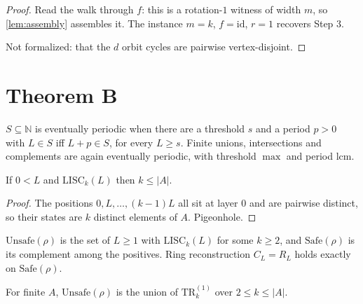 \begin{proof}
\leanok
{}
Read the walk through $f$: this is a rotation-$1$ witness of width $m$, so
\ref{lem:assembly} assembles it. The instance $m=k$, $f = \mathrm{id}$, $r=1$
recovers Step 3.

Not formalized: that the $d$ orbit cycles are pairwise vertex-disjoint.
\end{proof}

\section{Theorem B}

\begin{definition}
\label{def:evperiodic}
\leanok
$S \subseteq \mathbb{N}$ is eventually periodic when there are a threshold $s$
and a period $p > 0$ with $L \in S$ iff $L+p \in S$, for every $L \geq s$.
Finite unions, intersections and complements are again eventually periodic,
with threshold $\max$ and period $\mathrm{lcm}$.
\end{definition}

\begin{lemma}
\label{lem:kcap}
\leanok
{}
If $0 < L$ and $\mathrm{LISC}_k(L)$ then $k \leq |A|$.
\end{lemma}

\begin{proof}
\leanok
{}
The positions $0, L, \dots, (k-1)L$ all sit at layer $0$ and are pairwise
distinct, so their states are $k$ distinct elements of $A$. Pigeonhole.
\end{proof}

\begin{definition}
\label{def:unsafe-safe}
\leanok
{}
$\mathrm{Unsafe}(\rho)$ is the set of $L \geq 1$ with $\mathrm{LISC}_k(L)$ for
some $k \geq 2$, and $\mathrm{Safe}(\rho)$ is its complement among the
positives. Ring reconstruction $C_L = R_L$ holds exactly on
$\mathrm{Safe}(\rho)$.
\end{definition}

\begin{lemma}
\label{lem:unsafe-biunion}
\leanok
{}
For finite $A$, $\mathrm{Unsafe}(\rho)$ is the union of $\mathrm{TR}_k^{(1)}$
over $2 \leq k \leq |A|$.
\end{lemma}

